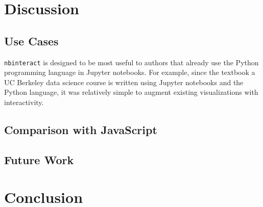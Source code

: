 \documentclass[nobib]{tufte-handout}
\newcommand{\code}[1]{\texttt{#1}}
\begin{document}


\section{Discussion} %
\label{sec:discussion}

\subsection{Use Cases} %
\label{sub:use_cases}

\code{nbinteract} is designed to be most useful to authors that already use
the Python programming language in Jupyter notebooks. For example, since the
textbook a UC Berkeley data science course is written using Jupyter notebooks
and the Python language, it was relatively simple to augment existing
visualizations with interactivity.


\subsection{Comparison with JavaScript} %
\label{sub:comparison_with_javascript}


\subsection{Future Work} %
\label{sub:future_work}



\section{Conclusion} %
\label{sec:conclusion}


\newpage

\printbibliography
\end{document}
